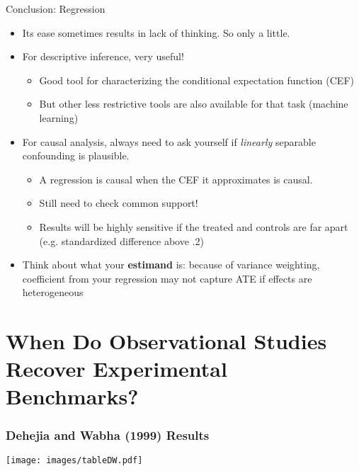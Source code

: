 \documentclass{beamer}
\numberwithin{equation}{section}
\begin{document}
\begin{frame}{Conclusion: Regression}
\small
\begin{center}
\end{center}

\pause

\begin{itemize}
\itemsep1pt\parskip0pt
\item
  Its ease sometimes results in lack of thinking. So only a little.
  \smiley
\item
  For descriptive inference, very useful!

  \begin{itemize}
  \itemsep1pt\parskip0pt
  \item
    Good tool for characterizing the conditional expectation function
    (CEF)
  \item
    But other less restrictive tools are also available for that task
    (machine learning) \pause
  \end{itemize}
\item
  For causal analysis, always need to ask yourself if \emph{linearly}
  separable confounding is plausible.

  \begin{itemize}
  \itemsep1pt\parskip0pt
  \item
    A regression is causal when the CEF it approximates is causal.\\
  \item
    Still need to check common support! 
    \item Results will be highly sensitive if the treated and controls are far apart (e.g. standardized difference above .2)
  \end{itemize}
\item
  Think about what your \textbf{estimand} is: because of variance
  weighting, coefficient from your regression may not capture ATE if effects are heterogeneous
\end{itemize}

\end{frame}

\section{When Do Observational Studies Recover Experimental
Benchmarks?}\label{when-do-observational-studies-recover-experimental-benchmarks}

\begin{frame}
  \frametitle{Dehejia and Wabha (1999) Results}
  \texttt{[image: images/tableDW.pdf]}
\end{frame}
\end{document}
